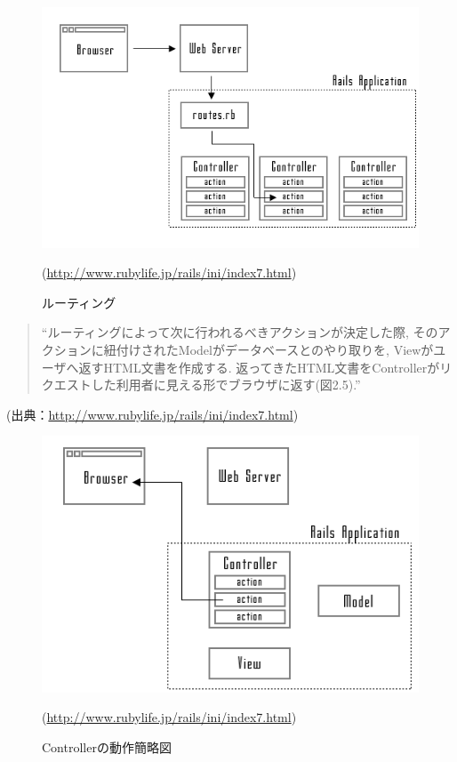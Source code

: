 \begin{description}
\begin{itemize}
\begin{figure}
\begin{center}
\includegraphics[width=13cm]{fig/route.png}
\caption{ルーティング}
\end{center}
\begin{flushright}
(\url{http://www.rubylife.jp/rails/ini/index7.html})
\end{flushright}
\end{figure}

\begin{quotation}
\begin{screen}
“ルーティングによって次に行われるべきアクションが決定した際, そのアクションに紐付けされたModelがデータベースとのやり取りを, Viewがユーザへ返すHTML文書を作成する.
返ってきたHTML文書をControllerがリクエストした利用者に見える形でブラウザに返す(図2.5).”
\end{screen}
\end{quotation}
\begin{flushright}
(出典：\url{http://www.rubylife.jp/rails/ini/index7.html})
\end{flushright}

\begin{figure}
\begin{center}
\includegraphics[width=13cm]{fig/controller.png}
\caption{Controllerの動作簡略図}
\end{center}
\begin{flushright}
(\url{http://www.rubylife.jp/rails/ini/index7.html})
\end{flushright}
\end{figure}


\end{itemize}
\end{description}
